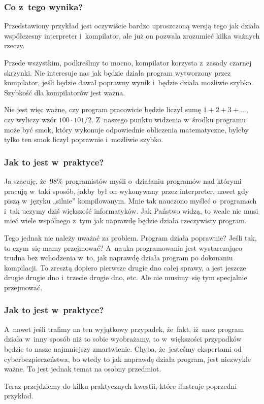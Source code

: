 \documentclass[10pt,t]{beamer}
\begin{document}
\begin{frame}
  \frametitle{Co z~tego wynika?}


  Przedstawiony przykład jest oczywiście bardzo uproszczoną wersją tego
  jak działa współczesny interpreter i~kompilator, ale już on pozwala
  zrozumieć kilka ważnych rzeczy.

  Przede wszystkim, podkreślmy to mocno,  kompilator korzysta z~zasady
  czarnej skrzynki. Nie interesuje nas jak będzie działa program wytworzony
  przez kompilator, jeśli będzie dawał poprawny wynik i~będzie działa
  możliwie szybko. Szybkość dla kompilatorów \alert{jest} ważna.

  Nie jest więc ważne, czy program pracowicie będzie liczył sumę
  $1 + 2 + 3 + \ldots$, czy wyliczy wzór $100 \cdot 101 / 2$.
  Z~naszego punktu widzenia w~środku programu może być smok, który wykonuje
  odpowiednie obliczenia matematyczne, byleby tylko ten smok liczył
  poprawnie i~możliwie szybko.

\end{frame}





\begin{frame}
  \frametitle{Jak to jest w~praktyce?}


  Ja szacuję, że~98\% programistów myśli o~działaniu programów nad którymi
  pracują w~taki sposób, jakby był on wykonywany przez interpreter, nawet
  gdy piszą w~języku „silnie” kompilowanym. Mnie tak nauczono myśleć
  o~programach i~tak uczymy dziś większość informatyków. Jak Państwo widzą,
  to wcale nie musi mieć wiele wspólnego z~tym jak \alert{naprawdę} będzie
  działa \alert{rzeczywisty} program.

  Tego jednak nie należy uważać za problem. Program działa poprawnie? Jeśli
  tak, to czym~się mamy przejmować? A~nauka programowania jest wystarczająco
  trudna bez wchodzenia w~to, jak naprawdę działa program po dokonaniu
  kompilacji. To zresztą dopiero pierwsze drugie dno całej sprawy, a jest
  jeszcze drugie drugie dno i~trzecie drugie dno, etc. Ale nie musimy~się
  tym specjalnie przejmować.

\end{frame}





\begin{frame}
  \frametitle{Jak to jest w~praktyce?}


  A~nawet jeśli trafimy na ten wyjątkowy przypadek, że~fakt, iż~nasz
  program działa w~inny sposób niż to sobie wyobrażamy, to w~większości
  przypadków będzie to nasze najmniejszy zmartwienie. Chyba, że~jesteśmy
  ekspertami od cyberbezpieczeństwa, bo wtedy to jak \alert{naprawdę}
  działa program, jest niezwykle ważne. To jest jednak temat na osobny
  przedmiot.

  Teraz przejdziemy do kilku praktycznych kwestii, które ilustruje
  poprzedni przykład.

\end{frame}
\end{document}

